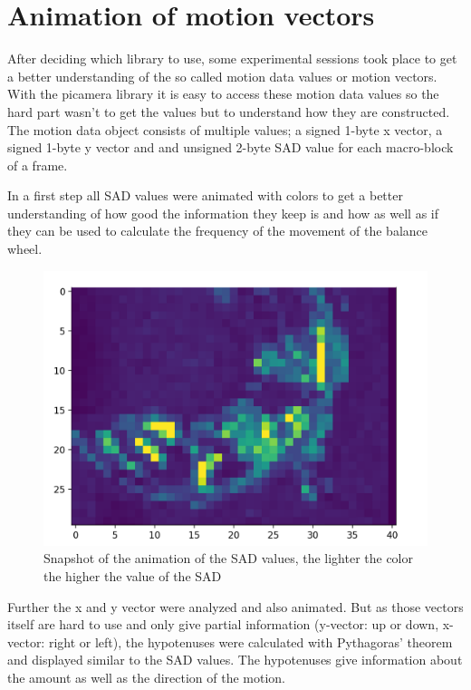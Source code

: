 \documentclass[12pt, a4paper]{report}
\begin{document}
    \section{Animation of motion vectors}
    After deciding which library to use, some experimental sessions took place to get a better understanding of the so called motion data values or motion vectors. 
    With the picamera library it is easy to access these motion data values so the hard part wasn't to get the values but to understand how they are constructed. 
    The motion data object consists of multiple values; a signed 1-byte x vector, a signed 1-byte y vector and and unsigned 2-byte SAD value for each macro-block of a frame.
    
    In a first step all SAD values were animated with colors to get a better understanding of how good the information they keep is and how as well as if they can be used to calculate the frequency of the movement of the balance wheel.
    
    \noindent
    \begin{figure}[H]
    \centering
    \includegraphics[scale=0.6]{Images/animation_sad.png}
    
    \caption{Snapshot of the animation of the SAD values, the lighter the color the higher the value of the SAD}
    \end{figure}
     
    Further the x and y vector were analyzed and also animated. But as those vectors itself are hard to use and only give partial information (y-vector: up or down, x-vector: right or left), the hypotenuses were calculated with Pythagoras' theorem and displayed similar to the SAD values. The hypotenuses give information about the amount as well as the direction of the motion.
    
\end{document}
